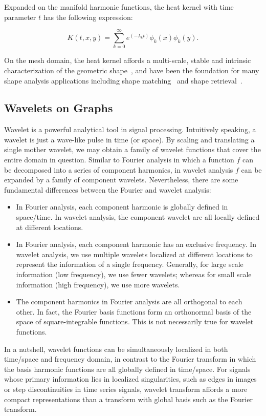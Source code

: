 Expanded on the manifold harmonic functions, the heat kernel with time parameter
$t$ has the following expression:

\begin{equation}
K(t,x,y)=\sum_{k=0}^{\infty} e^(-\lambda_k t) \phi_k(x)\phi_k(y).
\end{equation}

On the mesh domain, the heat kernel affords a multi-scale, stable and intrinsic
characterization of the geometric shape~\cite{Sun:2009:CGF}, and have been
the foundation for many shape analysis applications including shape matching~\cite{Ovsjanikov2010}
and shape retrieval~\cite{Bronstein2011}.


\subsection{Wavelets on Graphs}

Wavelet is a powerful analytical tool in signal processing. Intuitively speaking,
a wavelet is just a wave-like pulse in time (or space). By scaling and translating
a single mother wavelet, we may obtain a family of wavelet functions that cover
the entire domain in question. Similar to Fourier analysis in which a function $f$
can be decomposed into a series of component harmonics, in wavelet analysis $f$
can be expanded by a family of component wavelets. Nevertheless, there are some
fundamental differences between the Fourier and wavelet analysis:

\begin{itemize}
\item In Fourier analysis, each component harmonic is globally defined in space/time. In wavelet analysis, the component wavelet are all locally defined at different locations.
\item In Fourier analysis, each component harmonic has an exclusive frequency. In wavelet analysis, we use multiple wavelets localized at different locations to represent the information of a single frequency. Generally, for large scale information (low frequency), we use fewer wavelets; whereas for small scale information (high frequency), we use more wavelets.
\item The component harmonics in Fourier analysis are all orthogonal to each other. In fact, the Fourier basis functions form an orthonormal basis of the space of square-integrable functions. This is not necessarily true for wavelet functions.
\end{itemize}

In a nutshell, wavelet functions can be simultaneously localized in both time/space and frequency domain,
in contrast to the Fourier transform in which the basis harmonic functions are all globally defined
in time/space. For signals whose primary information lies in localized singularities, such as edges
in images or step discontinuities in time series signals, wavelet transform affords a more compact
representations than a transform with global basis such as the Fourier transform.

